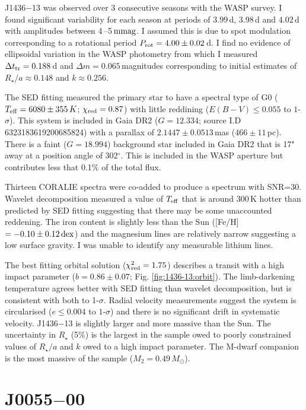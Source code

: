 J1436$-$13 was observed over 3 consecutive seasons with the WASP survey. I found significant variability for each season at periods of $3.99$\,\rm d, $3.98$\,\rm d and $4.02$\,\rm d with amplitudes between 4\,--5\,$\rm mmag$. I assumed this is due to spot modulation corresponding to a rotational period $P_{\rm rot} = 4.00\pm 0.02$\,d. I find no evidence of ellipsoidal variation in the WASP photometry from which I measured $\Delta t_{\rm tr} = 0.188$\,d and $\Delta m = 0.065$\,magnitudes corresponding to initial estimates of $R_{\star}/a \approx 0.148$ and $k \approx 0.256$.

The SED fitting measured the primary star to have a spectral type of G0 ($T_{\rm eff} = 6080 \pm 355\,K$; $\chi_{\rm red} = 0.87$) with little reddining ($E(B-V) \leq 0.055$ to $1$-$\sigma$). This system is included in Gaia DR2 ($G=12.334$; source I.D 6323183619200685824) with a parallax of $2.1447 \pm 0.0513$\,mas ($466 \pm 11$\,pc). There is a faint ($G=18.994$) background star included in Gaia DR2 that is 17" away at a position angle of 302$^\circ$. This is included in the WASP aperture but contributes less that 0.1\% of the total flux.

Thirteen CORALIE spectra were co-added to produce a spectrum with SNR=$30$. Wavelet decomposition measured a value of $T_{\rm eff}$ that is around $300$\,K hotter than predicted by SED fitting suggesting that there may be some unaccounted reddening. The iron content is slightly less than the Sun ([Fe/H]$ = -0.10 \pm 0.12\, \rm dex$) and the magnesium lines are relatively narrow suggesting a low surface gravity. I was unable to identify any measurable lithium lines.

The best fitting orbital solution ($\chi_{\rm red}^2 = 1.75$) describes a transit with a high impact parameter ($b = 0.86 \pm 0.07$; Fig. \ref{fig:1436-13:orbit}). The limb-darkening temperature agrees better with SED fitting than wavelet decomposition, but is consistent with both to 1-$\sigma$. Radial velocity measurements suggest the system is circularised ($e \leq 0.004$ to $1$-$\sigma$) and there is no significant drift in systematic velocity. J1436$-$13 is slightly larger and more massive than the Sun. The uncertainty in $R_\star$ (5\%) is the largest in the sample owed to poorly constrained values of $R_\star / a$ and $k$ owed to a high impact parameter. The M-dwarf companion is the most massive of the sample ($M_2 = 0.49\,M_\odot$).




\section{J0055$-$00}


